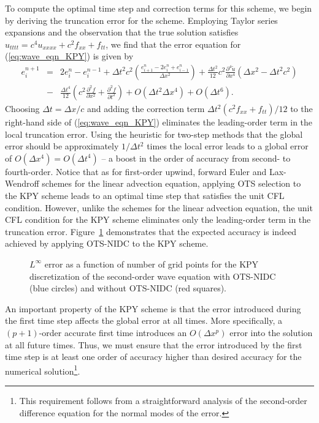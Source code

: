 \documentclass[fleqn,12pt,twoside]{article}
\newcommand{\bea}{\begin{eqnarray}}
\newcommand{\eea}{\end{eqnarray}}
\def\pt{\partial t}
\def\px{\partial x}
\def\tu{\tilde{u}}
\def\dt{\Delta t}
\def\dx{\Delta x}
\begin{document}
To compute the optimal time step and correction terms for this scheme, we
begin by deriving the truncation error for the scheme.  Employing Taylor 
series expansions and the observation that the true solution satisfies
$u_{tttt} = c^4 u_{xxxx} + c^2 f_{xx} + f_{tt}$, we find that the error
equation for (\ref{eq:wave_eqn_KPY}) is given by
\bea
  e^{n+1}_i &=& 2 e^n_i - e^{n-1}_i
  + \dt^2 c^2 \left( \frac{e^{n}_{i+1} - 2 e^n_i + e^n_{i-1}}{\dx^2} \right)
  + \frac{\dt^2}{12} c^2 \frac{\partial^4 \tu}{\px^4} 
    \left( \dx^2 - \dt^2 c^2 \right)
  \nonumber \\
  &-& \frac{\dt^4}{12} \left( c^2 \frac{\partial^2 f}{\px^2} 
                            + \frac{\partial^2 f}{\pt^2} \right)
      + O(\dt^2 \dx^4) + O(\dt^6).
\eea
Choosing $\dt = \dx/c$ and adding the correction term 
$\dt^2 \left(c^2 f_{xx} + f_{tt} \right)/12$ to the right-hand side of 
(\ref{eq:wave_eqn_KPY}) eliminates the leading-order term in the local 
truncation error.  Using the heuristic for two-step methods that the global 
error should be approximately $1/\dt^2$ times the local error leads to a 
global error of $O(\dx^4) = O(\dt^4)$ -- a boost in the order of accuracy 
from second- to fourth-order.  Notice that as for first-order upwind, forward 
Euler and Lax-Wendroff schemes for the linear advection equation, applying OTS 
selection to the KPY scheme leads to an optimal time step that satisfies the 
unit CFL condition.  However, unlike the schemes for the linear advection 
equation, the unit CFL condition for the KPY scheme eliminates only the 
leading-order term in the truncation error.  Figure~\ref{fig:wave_eqn_1d_error} 
demonstrates that the expected accuracy is indeed achieved by applying 
OTS-NIDC to the KPY scheme.  
\begin{figure}[tb]
\begin{center}
\caption{$L^\infty$ error as a function of number of grid points for the
  KPY discretization of the second-order wave equation with OTS-NIDC 
  (blue circles) and without OTS-NIDC (red squares).
}
\label{fig:wave_eqn_1d_error}
\end{center}
\end{figure}

An important property of the KPY scheme is that the error introduced during 
the first time step affects the global error at all times.  More specifically, 
a $(p+1)$-order accurate first time introduces an $O(\dx^p)$ error into the 
solution at all future times.  Thus, we must ensure that the error introduced
by the first time step is at least one order of accuracy higher than desired
accuracy for the numerical solution\footnote{This requirement follows from a
straightforward analysis of the second-order difference equation for the
normal modes of the error.}.
\end{document}
